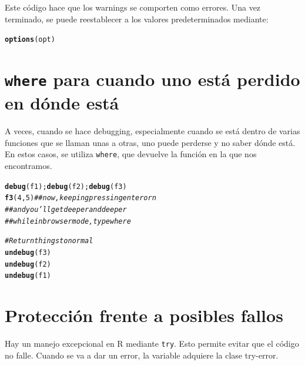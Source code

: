 \documentclass{config/apuntes}\usepackage[]{graphicx}\usepackage[]{xcolor}
\makeatletter
\newcommand{\hlnum}[1]{\textcolor[rgb]{0.686,0.059,0.569}{#1}}%
\newcommand{\hlcom}[1]{\textcolor[rgb]{0.678,0.584,0.686}{\textit{#1}}}%
\newcommand{\hldef}[1]{\textcolor[rgb]{0.345,0.345,0.345}{#1}}%
\newcommand{\hlkwd}[1]{\textcolor[rgb]{0.737,0.353,0.396}{\textbf{#1}}}%
\newenvironment{kframe}{%
 \def\at@end@of@kframe{}%
 \ifinner\ifhmode%
  \def\at@end@of@kframe{\end{minipage}}%
  \begin{minipage}{\columnwidth}%
 \fi\fi%
 \def\FrameCommand##1{\hskip\@totalleftmargin \hskip-\fboxsep
 \colorbox{shadecolor}{##1}\hskip-\fboxsep
     \hskip-\linewidth \hskip-\@totalleftmargin \hskip\columnwidth}%
 \MakeFramed {\advance\hsize-\width
   \@totalleftmargin\z@ \linewidth\hsize
   \@setminipage}}%
 {\par\unskip\endMakeFramed%
 \at@end@of@kframe}
\newenvironment{knitrout}{}{} %
\newcommand{\code}[1]{\texttt{#1}}
\makeatother
\begin{document}
Este código hace que los warnings se comporten como errores. Una vez terminado, se puede reestablecer a los valores predeterminados mediante:

\begin{knitrout}
\color{fgcolor}\begin{kframe}
\begin{alltt}
\hlkwd{options}\hldef{(opt)}
\end{alltt}
\end{kframe}
\end{knitrout}

\section{\code{where} para cuando uno está perdido en dónde está}
A veces, cuando se hace debugging, especialmente cuando se está dentro de varias funciones que se llaman unas a otras, uno puede perderse y no saber dónde está. En estos casos, se utiliza \code{where}, que devuelve la función en la que nos encontramos.

\begin{knitrout}
\color{fgcolor}\begin{kframe}
\begin{alltt}
\hlkwd{debug}\hldef{(f1);} \hlkwd{debug}\hldef{(f2);} \hlkwd{debug}\hldef{(f3)}
\hlkwd{f3}\hldef{(}\hlnum{4}\hldef{,} \hlnum{5}\hldef{)} \hlcom{## now, keeping pressing enter or n}
         \hlcom{## and you'll get deeper and deeper}
         \hlcom{## while in browser mode, type where}

\hlcom{#Return things to normal}
\hlkwd{undebug}\hldef{(f3)}
\hlkwd{undebug}\hldef{(f2)}
\hlkwd{undebug}\hldef{(f1)}
\end{alltt}
\end{kframe}
\end{knitrout}

\section{Protección frente a posibles fallos}
Hay un manejo excepcional en R mediante \code{try}. Esto permite evitar que el código no falle. Cuando se va a dar un error, la variable adquiere la clase try-error.
\end{document}
